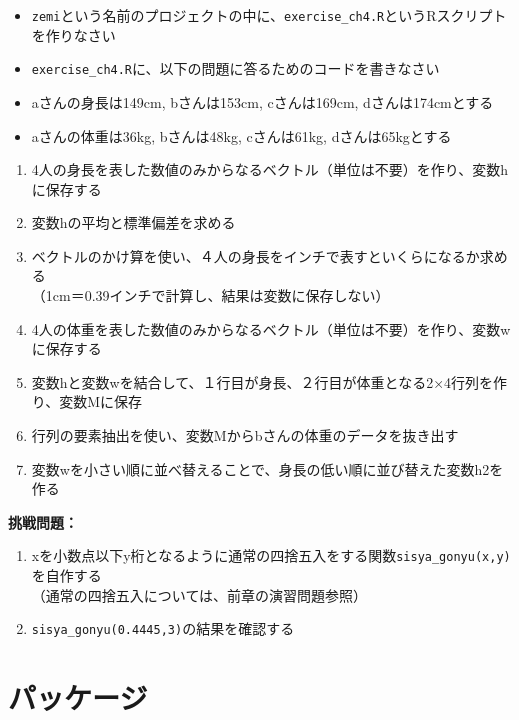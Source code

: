 \documentclass[
]{book}
\providecommand{\tightlist}{%
  \setlength{\itemsep}{0pt}\setlength{\parskip}{0pt}}
\begin{document}
\begin{itemize}
\item
  \texttt{zemi}という名前のプロジェクトの中に、\texttt{exercise\_ch4.R}というRスクリプトを作りなさい
\item
  \texttt{exercise\_ch4.R}に、以下の問題に答るためのコードを書きなさい
\item
  aさんの身長は149cm, bさんは153cm, cさんは169cm, dさんは174cmとする
\item
  aさんの体重は36kg, bさんは48kg, cさんは61kg, dさんは65kgとする\\
\end{itemize}

\begin{enumerate}
\def\labelenumi{\arabic{enumi}.}
\tightlist
\item
  4人の身長を表した数値のみからなるベクトル（単位は不要）を作り、変数hに保存する
\item
  変数hの平均と標準偏差を求める\\
\item
  ベクトルのかけ算を使い、４人の身長をインチで表すといくらになるか求める\\
  （1cm＝0.39インチで計算し、結果は変数に保存しない）\\
\item
  4人の体重を表した数値のみからなるベクトル（単位は不要）を作り、変数wに保存する
\item
  変数hと変数wを結合して、１行目が身長、２行目が体重となる2×4行列を作り、変数Mに保存\\
\item
  行列の要素抽出を使い、変数Mからbさんの体重のデータを抜き出す
\item
  変数wを小さい順に並べ替えることで、身長の低い順に並び替えた変数h2を作る
\end{enumerate}

\textbf{挑戦問題：}

\begin{enumerate}
\def\labelenumi{\arabic{enumi}.}
\tightlist
\item
  xを小数点以下y桁となるように通常の四捨五入をする関数\texttt{sisya\_gonyu(x,y)}を自作する\\
  （通常の四捨五入については、前章の演習問題参照）
\item
  \texttt{sisya\_gonyu(0.4445,3)}の結果を確認する
\end{enumerate}

\hypertarget{ux30d1ux30c3ux30b1ux30fcux30b8}{%
\chapter{パッケージ}\label{ux30d1ux30c3ux30b1ux30fcux30b8}}
\end{document}
